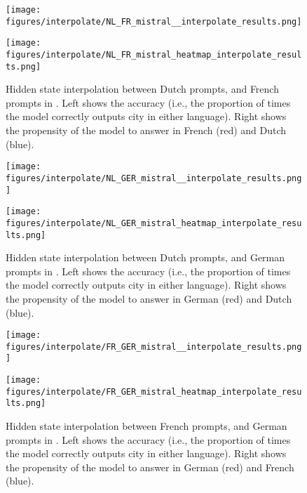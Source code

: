 \begin{figure}[h]
\begin{minipage}{0.49\textwidth}
    \centering
    \texttt{[image: figures/interpolate/NL\_FR\_mistral\_\_interpolate\_results.png]} 
\end{minipage}
\begin{minipage}{0.49\textwidth}
    \centering
    \texttt{[image: figures/interpolate/NL\_FR\_mistral\_heatmap\_interpolate\_results.png]} 
\end{minipage}
\caption{Hidden state interpolation between Dutch prompts, and French prompts in \mistral. Left shows the accuracy (i.e., the proportion of times the model correctly outputs city in either language). Right shows the propensity of the model to answer in French (red) and Dutch (blue). }
\end{figure}


\begin{figure}[h]
\begin{minipage}{0.49\textwidth}
    \centering
    \texttt{[image: figures/interpolate/NL\_GER\_mistral\_\_interpolate\_results.png]} 
\end{minipage}
\begin{minipage}{0.49\textwidth}
    \centering
    \texttt{[image: figures/interpolate/NL\_GER\_mistral\_heatmap\_interpolate\_results.png]} 
\end{minipage}
\caption{Hidden state interpolation between Dutch prompts, and German prompts in \mistral. Left shows the accuracy (i.e., the proportion of times the model correctly outputs city in either language). Right shows the propensity of the model to answer in German (red) and Dutch (blue). }
\end{figure}

\begin{figure}[h]
\begin{minipage}{0.49\textwidth}
    \centering
    \texttt{[image: figures/interpolate/FR\_GER\_mistral\_\_interpolate\_results.png]} 
\end{minipage}
\begin{minipage}{0.49\textwidth}
    \centering
    \texttt{[image: figures/interpolate/FR\_GER\_mistral\_heatmap\_interpolate\_results.png]} 
\end{minipage}
\caption{Hidden state interpolation between French prompts, and German prompts in \mistral. Left shows the accuracy (i.e., the proportion of times the model correctly outputs city in either language). Right shows the propensity of the model to answer in German (red) and French (blue). }
\end{figure}


